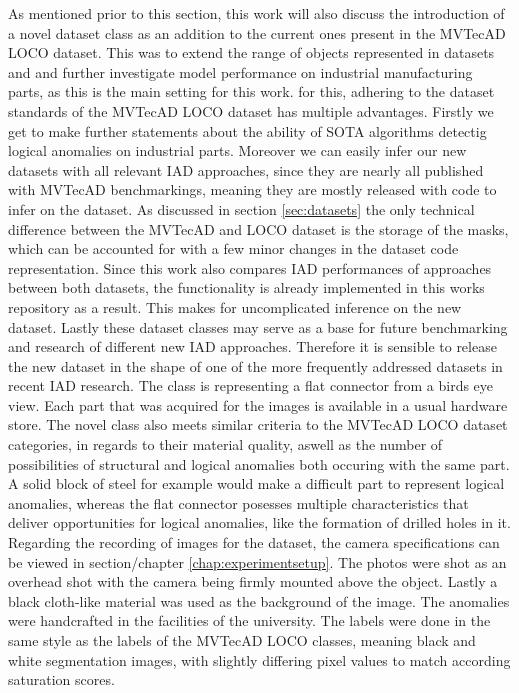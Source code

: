 As mentioned prior to this section, this work will also discuss the introduction of a novel dataset class as an addition to the current ones present in the MVTecAD LOCO dataset.
This was to extend the range of objects represented in datasets \cite{MVTEC_Bergmann_2021} and \cite{LOCODentsAndScratchesBergmann2022} and further investigate model performance on industrial manufacturing parts, as this is the 
main setting for this work. for this, adhering to the dataset standards of the MVTecAD LOCO dataset has multiple advantages. Firstly we get to make further statements about the ability of SOTA algorithms detectig 
logical anomalies on industrial parts. Moreover we can easily infer our new datasets with all relevant IAD approaches, since they are nearly all published with MVTecAD benchmarkings, meaning 
they are mostly released with code to infer on the dataset. As discussed in section \ref{sec:datasets} the only technical difference between the MVTecAD and LOCO dataset is the storage of the masks, 
which can be accounted for with a few minor changes in the dataset code representation. Since this work also compares IAD performances of approaches between both datasets, the functionality 
is already implemented in this works repository as a result. This makes for uncomplicated inference on the new dataset. Lastly these dataset classes may serve as a base for future benchmarking 
and research of different new IAD approaches. Therefore it is sensible to release the new dataset in the shape of one of the more frequently addressed datasets in recent IAD research. 
The class is representing a flat connector from a birds eye view. Each part that was acquired for the images is available in a 
usual hardware store. The novel class also 
meets similar criteria to the MVTecAD LOCO dataset categories, in regards to their material quality, aswell as the number of possibilities of structural and logical anomalies both occuring with the same part. A solid block of steel for example 
would make a difficult part to represent logical anomalies, whereas the flat connector posesses multiple characteristics that deliver opportunities for logical anomalies, like the formation of drilled holes in it.
Regarding the recording of images for the dataset, the camera specifications can be viewed in section/chapter \ref{chap:experimentsetup}. The photos were shot as an overhead shot with the camera being firmly 
mounted above the object. Lastly a black cloth-like material was used 
as the background of the image. The anomalies were handcrafted in the facilities of the university. The labels 
were done in the same style as the labels of the MVTecAD LOCO classes, meaning black and white segmentation images, with slightly differing pixel values to match according saturation scores. 

